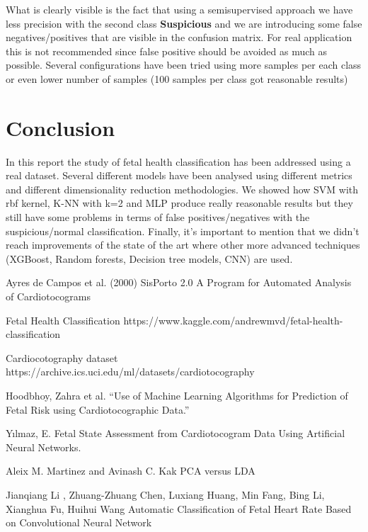 \documentclass[a4paper,12pt]{article}
\begin{document}
\noindent What is clearly visible is the fact that using a semisupervised approach we have less precision with the second class \textbf{Suspicious} and we are introducing some false negatives/positives that are visible in the confusion matrix. For real application this is not recommended since false positive should be avoided as much as possible. Several configurations have been tried using more samples per each class or even lower number of samples (100 samples per class got reasonable results)

\newpage
\section{Conclusion}

In this report the study of fetal health classification has been addressed using a real dataset. Several different models have been analysed using different metrics and different dimensionality reduction methodologies. We showed how SVM with rbf kernel, K-NN with k=2 and MLP produce really reasonable results but they still have some problems in terms of false positives/negatives with the suspicious/normal classification. Finally, it's important to mention that we didn't reach improvements of the state of the art where other more advanced techniques (XGBoost, Random forests, Decision tree models, CNN) are used. \cite{ann} \cite{cnn}


\begin{thebibliography}{9}
Ayres de Campos et al. (2000) SisPorto 2.0 A Program for Automated Analysis of Cardiotocograms

Fetal Health Classification https://www.kaggle.com/andrewmvd/fetal-health-classification

Cardiocotography dataset https://archive.ics.uci.edu/ml/datasets/cardiotocography

Hoodbhoy, Zahra et al. “Use of Machine Learning Algorithms for Prediction of Fetal Risk using Cardiotocographic Data.”

Yılmaz, E. Fetal State Assessment from Cardiotocogram Data Using Artificial Neural Networks.

Aleix M. Martinez and Avinash C. Kak PCA versus LDA

Jianqiang Li , Zhuang-Zhuang Chen, Luxiang Huang, Min Fang, Bing Li, Xianghua Fu, Huihui Wang Automatic Classification of Fetal Heart Rate Based on Convolutional Neural Network

\end{thebibliography}
\end{document}
